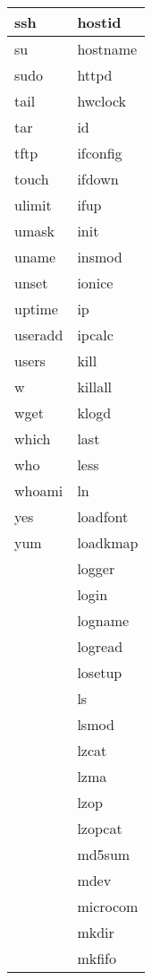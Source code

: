 \begin{longtable}{p{64mm}p{64mm}}
     \hline
     ssh & hostid \\
     \hline
     su & hostname \\
     \hline
     sudo & httpd \\
     \hline
     tail & hwclock \\
     \hline
     tar & id \\
     \hline
     tftp & ifconfig \\
     \hline
     touch & ifdown \\
     \hline
     ulimit & ifup \\
     \hline
     umask & init \\
     \hline
     uname & insmod \\
     \hline
     unset & ionice \\
     \hline
     uptime & ip \\
     \hline
     useradd & ipcalc \\
     \hline
     users & kill \\
     \hline
     w & killall \\
     \hline
     wget & klogd \\
     \hline
     which & last \\
     \hline
     who & less \\
     \hline
     whoami & ln \\
     \hline
     yes & loadfont \\
     \hline
     yum & loadkmap \\
     \hline
      & logger \\
     \hline
      & login \\
     \hline
      & logname \\
     \hline
      & logread \\
     \hline
      & losetup \\
     \hline
      & ls \\
     \hline
      & lsmod \\
     \hline
      & lzcat \\
     \hline
      & lzma \\
     \hline
      & lzop \\
     \hline
      & lzopcat \\
     \hline
      & md5sum \\
     \hline
      & mdev \\
     \hline
      & microcom \\
     \hline
      & mkdir \\
     \hline
      & mkfifo \\

\end{longtable}
